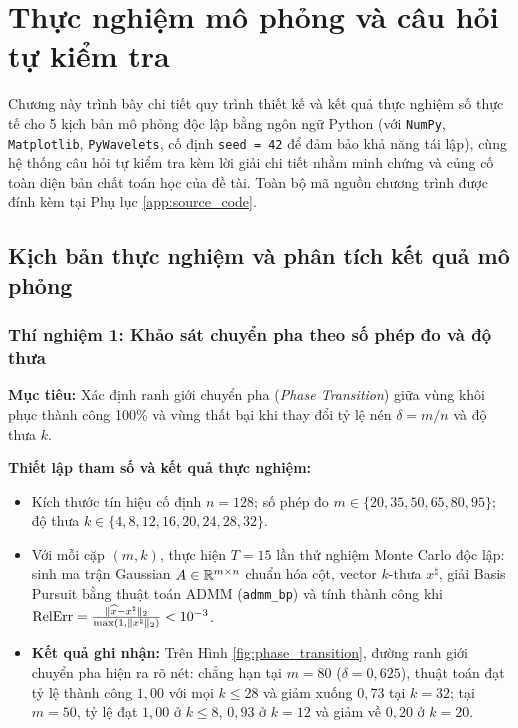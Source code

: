 \chapter{Thực nghiệm mô phỏng và câu hỏi tự kiểm tra}
\label{chap:thuc_nghiem}

Chương này trình bày chi tiết quy trình thiết kế và kết quả thực nghiệm số thực tế cho 5 kịch bản mô phỏng độc lập bằng ngôn ngữ Python (với \texttt{NumPy}, \texttt{Matplotlib}, \texttt{PyWavelets}, cố định \texttt{seed = 42} để đảm bảo khả năng tái lập), cùng hệ thống câu hỏi tự kiểm tra kèm lời giải chi tiết nhằm minh chứng và củng cố toàn diện bản chất toán học của đề tài. Toàn bộ mã nguồn chương trình được đính kèm tại Phụ lục \ref{app:source_code}.

\section{Kịch bản thực nghiệm và phân tích kết quả mô phỏng}
\label{sec:kich_ban_thuc_nghiem}

\subsection{Thí nghiệm 1: Khảo sát chuyển pha theo số phép đo và độ thưa}
\textbf{Mục tiêu:} Xác định ranh giới chuyển pha (\emph{Phase Transition}) \cite{donoho2006compressed} giữa vùng khôi phục thành công 100\% và vùng thất bại khi thay đổi tỷ lệ nén $\delta = m/n$ và độ thưa $k$.

\textbf{Thiết lập tham số và kết quả thực nghiệm:}
\begin{itemize}
    \item Kích thước tín hiệu cố định $n = 128$; số phép đo $m \in \{20, 35, 50, 65, 80, 95\}$; độ thưa $k \in \{4, 8, 12, 16, 20, 24, 28, 32\}$.
    \item Với mỗi cặp $(m, k)$, thực hiện $T = 15$ lần thử nghiệm Monte Carlo độc lập: sinh ma trận Gaussian $A \in \mathbb{R}^{m \times n}$ chuẩn hóa cột, vector $k$-thưa $x^\natural$, giải Basis Pursuit bằng thuật toán ADMM (\texttt{admm\_bp}) và tính thành công khi $\mathrm{RelErr} = \frac{\|\widehat{x} - x^\natural\|_2}{\max(1, \|x^\natural\|_2)} < 10^{-3}$.
    \item \textbf{Kết quả ghi nhận:} Trên Hình \ref{fig:phase_transition}, đường ranh giới chuyển pha hiện ra rõ nét: chẳng hạn tại $m = 80$ ($\delta = 0{,}625$), thuật toán đạt tỷ lệ thành công $1{,}00$ với mọi $k \le 28$ và giảm xuống $0{,}73$ tại $k = 32$; tại $m = 50$, tỷ lệ đạt $1{,}00$ ở $k \le 8$, $0{,}93$ ở $k = 12$ và giảm về $0{,}20$ ở $k = 20$.
\end{itemize}

